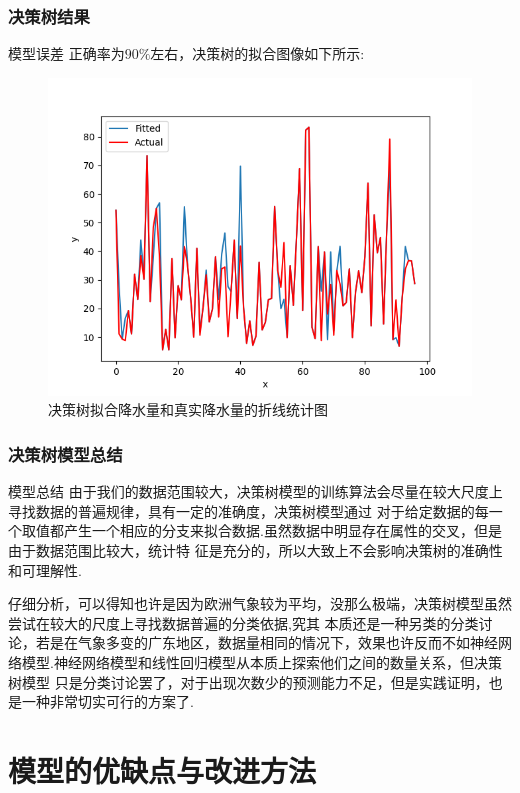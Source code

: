 \documentclass[10pt]{beamer}
\begin{document}
\begin{frame}
	\frametitle{决策树结果}
	\begin{block}{模型误差}
		正确率为$90\%$左右，决策树的拟合图像如下所示:
		\begin{figure}[h!]
			\centering
			\includegraphics[scale=0.21]{../latex/very_success.png}
			\caption{决策树拟合降水量和真实降水量的折线统计图}
		\end{figure}
	\end{block}
\end{frame}
\begin{frame}
	\frametitle{决策树模型总结}
	\begin{block}{模型总结}
		由于我们的数据范围较大，决策树模型的训练算法会尽量在较大尺度上寻找数据的普遍规律，具有一定的准确度，决策树模型通过
		对于给定数据的每一个取值都产生一个相应的分支来拟合数据.虽然数据中明显存在属性的交叉，但是由于数据范围比较大，统计特
		征是充分的，所以大致上不会影响决策树的准确性和可理解性.

		仔细分析，可以得知也许是因为欧洲气象较为平均，没那么极端，决策树模型虽然尝试在较大的尺度上寻找数据普遍的分类依据,究其
		本质还是一种另类的分类讨论，若是在气象多变的广东地区，数据量相同的情况下，效果也许反而不如神经网
		络模型.神经网络模型和线性回归模型从本质上探索他们之间的数量关系，但决策树模型
		只是分类讨论罢了，对于出现次数少的预测能力不足，但是实践证明，也是一种非常切实可行的方案了.
	\end{block}
\end{frame}

\section{模型的优缺点与改进方法}
\end{document}
